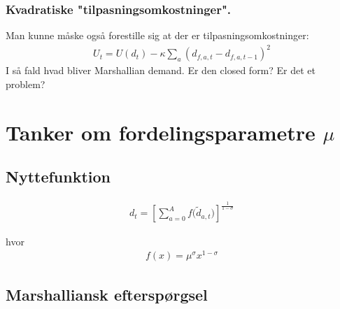 \documentclass[12pt]{article}
\begin{document}

\subsubsection{Kvadratiske "tilpasningsomkostninger".}
Man kunne måske også forestille sig at der er tilpasningsomkostninger:
\begin{align}
    U_t = U(d_t) - \kappa \sum_{a}(d_{f,a,t} - d_{f,a,t-1})^2
\end{align}
I så fald hvad bliver Marshallian demand. Er den closed form? Er det et problem? 



\section{Tanker om fordelingsparametre $\mu$}
\subsection*{Nyttefunktion}

\begin{align}
d_t = \left[ \sum_{a=0}^{A} f\big(\tilde{d}_{a,t}\big) \right]^{\frac{1}{1-\sigma}}
\end{align}

hvor
\begin{align}
f(x) = \mu^\sigma x^{1-\sigma}
\end{align}

\subsection*{Marshalliansk efterspørgsel}
\end{document}
